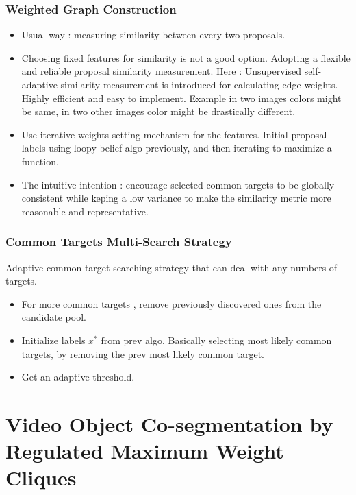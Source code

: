\documentclass{article}
\begin{document}
\subsubsection{Weighted Graph Construction}
\begin{itemize}
\item Usual way : measuring similarity between every two proposals.
\item Choosing fixed features for similarity is not a good option. Adopting a flexible and reliable proposal similarity measurement. Here : Unsupervised self-adaptive similarity measurement is introduced for calculating edge weights. Highly efficient and easy to implement. Example in two images colors might be same, in two other images color might be drastically different.
\item Use iterative weights setting mechanism for the features. Initial proposal labels using loopy belief algo previously, and then iterating to maximize a function.
\item The intuitive intention : encourage selected common targets to be globally consistent while keping a low variance to make the similarity metric more reasonable and representative.
\end{itemize}

\subsubsection{Common Targets Multi-Search Strategy}
Adaptive common target searching strategy that can deal with any numbers of targets.

\begin{itemize}
\item For more common targets , remove previously discovered ones from the candidate pool.
\item Initialize labels $x^{*}$ from prev algo. Basically selecting most likely common targets, by removing the prev most likely common target.
\item Get an adaptive threshold.
\end{itemize}

\section{Video Object Co-segmentation by Regulated Maximum Weight Cliques}
\cite{Zhang2014}
\end{document}
